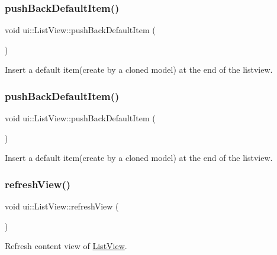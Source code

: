 \subsubsection{\texorpdfstring{push\+Back\+Default\+Item()}{pushBackDefaultItem()}\hspace{0.1cm}{\footnotesize\ttfamily [1/2]}}
{\footnotesize\ttfamily void ui\+::\+List\+View\+::push\+Back\+Default\+Item (\begin{DoxyParamCaption}{ }\end{DoxyParamCaption})}

Insert a default item(create by a cloned model) at the end of the listview. \mbox{\label{classui_1_1ListView_a9ef7771758b5ffa248ac88d3bff471fe}} 
\subsubsection{\texorpdfstring{push\+Back\+Default\+Item()}{pushBackDefaultItem()}\hspace{0.1cm}{\footnotesize\ttfamily [2/2]}}
{\footnotesize\ttfamily void ui\+::\+List\+View\+::push\+Back\+Default\+Item (\begin{DoxyParamCaption}{ }\end{DoxyParamCaption})}

Insert a default item(create by a cloned model) at the end of the listview. \mbox{\label{classui_1_1ListView_a67165072bad734eacc1cd3607471f024}} 
\subsubsection{\texorpdfstring{refresh\+View()}{refreshView()}\hspace{0.1cm}{\footnotesize\ttfamily [1/2]}}
{\footnotesize\ttfamily void ui\+::\+List\+View\+::refresh\+View (\begin{DoxyParamCaption}{ }\end{DoxyParamCaption})}



Refresh content view of \hyperlink{classui_1_1ListView}{List\+View}. 


